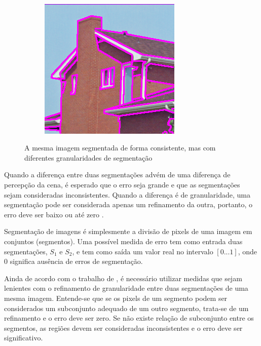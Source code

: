 \begin{figure}[h]
\begin{subfigure}[b]{0.3\textwidth}
  \end{subfigure}%
  ~
  \begin{subfigure}[b]{0.3\textwidth}
    \includegraphics[width=\textwidth]{imgs/granularidade_3}
  \end{subfigure}%
  \caption{A mesma imagem segmentada de forma consistente, mas com diferentes granularidades de segmentação}
  \label{fig:granularidade}
\end{figure}

Quando a diferença entre duas segmentações advém de uma diferença de percepção da cena, é esperado que o erro seja grande e que as segmentações sejam consideradas inconsistentes. Quando a diferença é de granularidade, uma segmentação pode ser considerada apenas um refinamento da outra, portanto, o erro deve ser baixo ou até zero \cite{martin:2001}.

Segmentação de imagens é simplesmente a divisão de pixels de uma imagem em conjuntos (segmentos). Uma possível medida de erro tem como entrada duas segmentações, $S_1$ e $S_2$, e tem como saída um valor real no intervalo $[0...1]$, onde $0$ significa ausência de erros de segmentação.

Ainda de acordo com o trabalho de , é necessário utilizar medidas que sejam lenientes com o refinamento de granularidade entre duas segmentações de uma mesma imagem. Entende-se que se os pixels de um segmento podem ser considerados um subconjunto adequado de um outro segmento, trata-se de um refinamento e o erro deve ser zero. Se não existe relação de subconjunto entre os segmentos, as regiões devem ser consideradas inconsistentes e o erro deve ser significativo.

